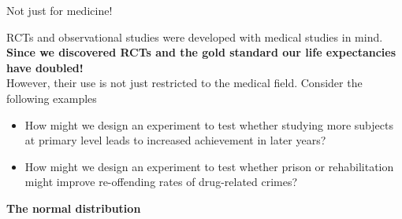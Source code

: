 \documentclass[12pt,xcolor=dvipsnames,handout,mathserif,aspectratio=169]{beamer}
\newcommand{\bbl}[1]{{\color{NavyBlue} \textbf{#1}}}
\newcommand{\bgr}[1]{{\color{PineGreen} \textbf{#1}}}
\begin{document}
%
%
%
\begin{frame}{Not just for medicine!}

RCTs and observational studies were developed with medical studies in mind. \bbl{Since we discovered RCTs and the gold standard our life expectancies have doubled!}\\
\vspace{0.5cm}
\pause
However, their use is not just restricted to the medical field. Consider the following examples
\begin{itemize}
\item How might we design an experiment to test whether studying more subjects at primary level leads to increased achievement in later years?
\pause
\item How might we design an experiment to test whether prison or rehabilitation might improve re-offending rates of drug-related crimes?
\end{itemize}

\end{frame}

\begin{frame}[fragile]{}
\bbl{\Huge The normal distribution}\\ 
\vspace{0.5cm}
\end{frame}
\end{document}
